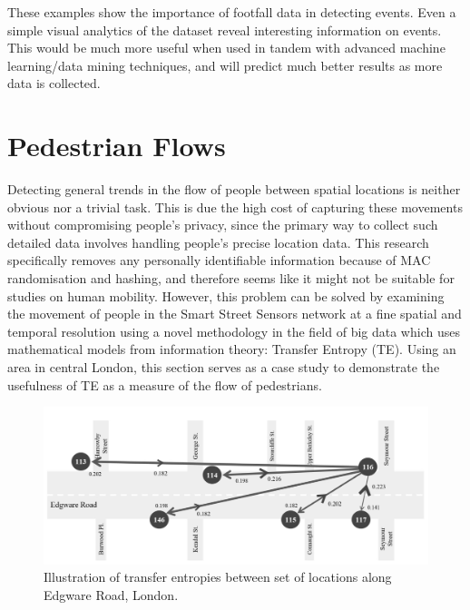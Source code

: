 These examples show the importance of footfall data in detecting events. 
Even a simple visual analytics of the dataset reveal interesting information on events. 
This would be much more useful when used in tandem with advanced machine learning/data mining techniques, and will predict much better results as more data is collected.

\section{Pedestrian Flows}

Detecting general trends in the flow of people between spatial locations is neither obvious nor a trivial task. 
This is due the high cost of capturing these movements without compromising people’s privacy, since the primary way to collect such detailed data involves handling people’s precise location data. 
This research specifically removes any personally identifiable information because of MAC randomisation and hashing, and therefore seems like it might not be suitable for studies on human mobility. 
However, this problem can be solved by examining the movement of people in the Smart Street Sensors network at a fine spatial and temporal resolution using a novel methodology in the field of big data which uses mathematical models from information theory: Transfer Entropy (TE). 
Using an area in central London, this section serves as a case study to demonstrate the usefulness of TE as a measure of the flow of pedestrians.

\begin{figure}
  \includegraphics[trim={0 0 0 0},clip]{images/applications-transfer-entropy.png}
  \caption{Illustration of transfer entropies between set of locations along Edgware Road, London.}
  \label{figure:applications:transent}
\end{figure}


